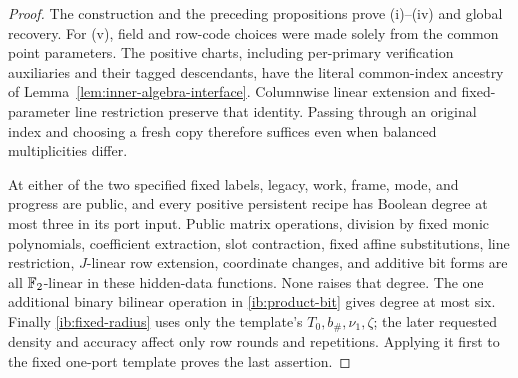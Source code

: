 \begin{proof}
The construction and the preceding propositions prove
(i)--(iv) and global recovery.  For (v), field and row-code choices
were made solely from the common point parameters.  The positive
charts, including per-primary verification auxiliaries and their
tagged descendants, have the literal common-index ancestry of
Lemma~\ref{lem:inner-algebra-interface}.  Columnwise linear
extension and fixed-parameter line restriction preserve that
identity.  Passing through an original index and choosing a fresh
copy therefore suffices even when balanced multiplicities differ.

At either of the two specified fixed labels, legacy, work, frame,
mode, and progress are public, and every positive persistent recipe
has Boolean degree at most three in its port input.  Public matrix
operations, division by fixed monic polynomials, coefficient
extraction, slot contraction, fixed affine substitutions, line
restriction, \(J\)-linear row extension, coordinate changes, and
additive bit forms are all \(\mathbb{F}_2\)-linear in these hidden-data
functions.  None raises that degree.  The one additional binary
bilinear operation in \eqref{ib:product-bit} gives degree at most
six.  Finally \eqref{ib:fixed-radius} uses only the template's
\(T_0,b_\#,\nu_1,\zeta\); the later requested density and
accuracy affect only row rounds and repetitions.  Applying it
first to the fixed one-port template proves the last assertion.
\end{proof}
